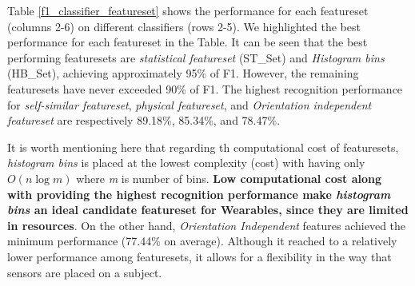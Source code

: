 \documentclass[journal,article,submit,moreauthors,pdftex]{Definitions/mdpi}
\begin{document}
Table \ref{f1_classifier_featureset} shows the performance for each featureset (columns 2-6) on different classifiers (rows 2-5). We highlighted the best performance for each featureset in the Table. It can be seen that the best performing featuresets are \textit{statistical featureset} (ST\_Set) and \textit{Histogram bins} (HB\_Set), achieving approximately 95\% of F1. However, the remaining featuresets have never exceeded 90\% of F1. The highest recognition performance for \textit{self-similar featureset}, \textit{physical featureset}, and \textit{Orientation independent featureset} are respectively 89.18\%, 85.34\%, and 78.47\%.

It is worth mentioning here that regarding th computational cost of featuresets, \textit{histogram bins} is placed at the lowest complexity (cost) with having only $ O(n\log m) $ where \textit{m} is number of bins. \textbf{Low computational cost along with providing the highest recognition performance make \textit{histogram bins} an ideal candidate featureset for Wearables, since they are limited in resources}. 
On the other hand, \textit{Orientation Independent} features achieved the minimum performance (77.44\% on average). Although it reached to a relatively lower performance among featuresets, it allows for a flexibility in the way that sensors are placed on a subject.

\end{document}
